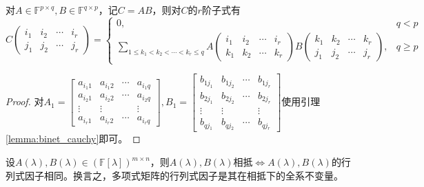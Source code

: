         \begin{proposition}
            \label{prop:poly_matrix_mul}
            对$A\in\mathbb{F}^{p\times q}, B\in\mathbb{F}^{q\times p}$，记$C=AB$，则对$C$的$r$阶子式有
             \[
                C\begin{pmatrix}i_1&i_2&\cdots&i_r\\j_1&j_2&\cdots&j_r\end{pmatrix}=\begin{cases}0,&q<p\\\sum\limits_{1\leq k_1<k_2<\cdots<k_r\leq q}A\begin{pmatrix}i_1&i_2&\cdots&i_r\\k_1&k_2&\cdots&k_r\end{pmatrix}B\begin{pmatrix}k_1&k_2&\cdots&k_r\\j_1&j_2&\cdots&j_r\end{pmatrix},&q\geq p\end{cases}
            \]
        \end{proposition}

        \begin{proof}
            对$A_1=\begin{bmatrix}a_{i_1 1}&a_{i_1 2}&\cdots&a_{i_1 q}\\a_{i_2 1}&a_{i_2 2}&\cdots&a_{i_2 q}\\\vdots&\vdots&&\vdots\\a_{i_r 1}&a_{i_r 2}&\cdots&a_{i_r q}\end{bmatrix},B_1=\begin{bmatrix}b_{1j_1}&b_{1j_2}&\cdots&b_{1j_r}\\b_{2j_1}&b_{2j_2}&\cdots&b_{2j_r}\\\vdots&\vdots&&\vdots\\b_{qj_1}&b_{qj_2}&\cdots&b_{qj_r}\end{bmatrix}$使用引理\ref{lemma:binet_cauchy}即可。
        \end{proof}

        \begin{theorem}
            \label{thm:poly_matrix_invariant}
            设$A(\lambda),B(\lambda)\in(\mathbb{F}[\lambda])^{m\times n}$，则$A(\lambda),B(\lambda)$相抵$\Leftrightarrow A(\lambda),B(\lambda)$的行列式因子相同。换言之，多项式矩阵的行列式因子是其在相抵下的全系不变量。
        \end{theorem}


